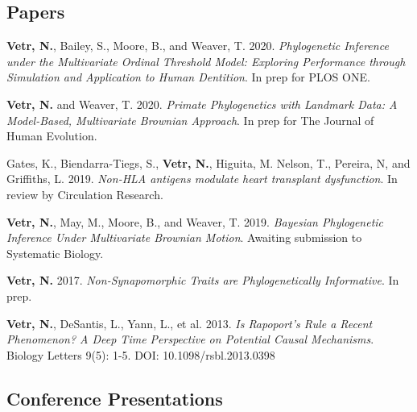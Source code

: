 \documentclass[12pt]{article}
\begin{document}
\subsection{Papers}

\begin{enumerate}[label={[\arabic*]}]

\item \textbf{Vetr, N.}, Bailey, S., Moore, B., and Weaver, T. 2020.  \emph{Phylogenetic Inference under the Multivariate Ordinal Threshold Model: Exploring Performance through Simulation and Application to Human Dentition}. In prep for PLOS ONE.

\item \textbf{Vetr, N.} and Weaver, T. 2020.  \emph{Primate Phylogenetics with Landmark Data: A Model-Based, Multivariate Brownian Approach}. In prep for The Journal of Human Evolution.

\item Gates, K., Biendarra-Tiegs, S., \textbf{Vetr, N.}, Higuita, M. Nelson, T., Pereira, N, and Griffiths, L. 2019.  \emph{Non-HLA antigens modulate heart transplant dysfunction}. In review by Circulation Research.

\item \textbf{Vetr, N.}, May, M., Moore, B., and Weaver, T. 2019.  \emph{Bayesian Phylogenetic Inference Under Multivariate Brownian Motion}. Awaiting submission to Systematic Biology.

\item \textbf{Vetr, N.} 2017.  \emph{Non-Synapomorphic Traits are Phylogenetically Informative}. In prep.

\item \textbf{Vetr, N.}, DeSantis, L., Yann, L., et al. 2013.  \emph{Is Rapoport’s Rule a Recent Phenomenon? A Deep Time Perspective on Potential Causal Mechanisms}. Biology Letters 9(5): 1-5. DOI: 10.1098/rsbl.2013.0398


\end{enumerate}


\subsection{Conference Presentations}
\end{document}
